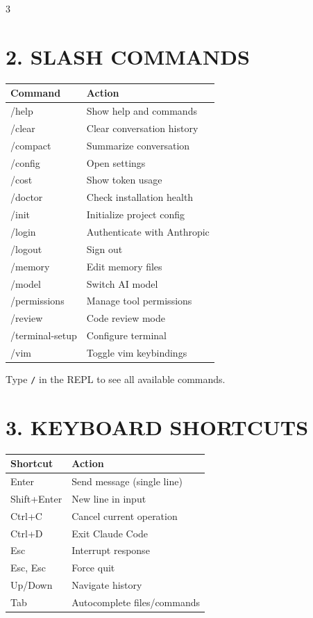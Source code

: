 \documentclass[landscape,11pt]{article}
\begin{document}
\begin{multicols}{3}
\section*{\textcolor{claudeblue}{2. SLASH COMMANDS}}
\renewcommand{\arraystretch}{1.15}
\begin{tabularx}{\linewidth}{@{}>{\ttfamily}l>{\raggedright\arraybackslash}X@{}}
\normalfont\textbf{Command} & \textbf{Action}\\
\hline
/help & Show help and commands\\
/clear & Clear conversation history\\
/compact & Summarize conversation\\
/config & Open settings\\
/cost & Show token usage\\
/doctor & Check installation health\\
/init & Initialize project config\\
/login & Authenticate with Anthropic\\
/logout & Sign out\\
/memory & Edit memory files\\
/model & Switch AI model\\
/permissions & Manage tool permissions\\
/review & Code review mode\\
/terminal-setup & Configure terminal\\
/vim & Toggle vim keybindings\\
\end{tabularx}
\renewcommand{\arraystretch}{1}

\vspace{2mm}
\begin{tcolorbox}[colback=claudeblue!8, colframe=claudeblue, boxsep=2pt, arc=1pt, fontupper=\small\itshape]
Type \texttt{/} in the REPL to see all available commands.
\end{tcolorbox}

\section*{\textcolor{claudegreen}{3. KEYBOARD SHORTCUTS}}
\renewcommand{\arraystretch}{1.15}
\begin{tabularx}{\linewidth}{@{}>{\ttfamily}l>{\raggedright\arraybackslash}X@{}}
\normalfont\textbf{Shortcut} & \textbf{Action}\\
\hline
Enter & Send message (single line)\\
Shift+Enter & New line in input\\
Ctrl+C & Cancel current operation\\
Ctrl+D & Exit Claude Code\\
Esc & Interrupt response\\
Esc, Esc & Force quit\\
Up/Down & Navigate history\\
Tab & Autocomplete files/commands\\
\end{tabularx}
\renewcommand{\arraystretch}{1}


\end{multicols}
\end{document}
